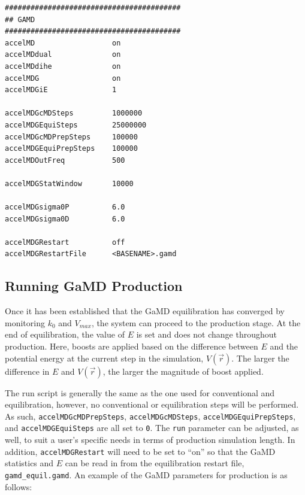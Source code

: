 \documentclass[9pt,tutorial]{livecoms}
\begin{document}
\begin{lstlisting}[label=gamd_prod,caption=gamd\_equil.in, basicstyle=\small,backgroundcolor=\color{light-gray}]
#########################################
## GAMD                    
#########################################
accelMD                  on             
accelMDdual              on
accelMDdihe              on
accelMDG                 on        
accelMDGiE               1             
         
accelMDGcMDSteps         1000000        
accelMDGEquiSteps        25000000     
accelMDGcMDPrepSteps     100000         
accelMDGEquiPrepSteps    100000         
accelMDOutFreq           500

accelMDGStatWindow       10000

accelMDGsigma0P          6.0            
accelMDGsigma0D          6.0 

accelMDGRestart          off 
accelMDGRestartFile      <BASENAME>.gamd  

\end{lstlisting}

\subsection{Running GaMD Production}
\label{ss:gamd_production}
Once it has been established that the GaMD equilibration has converged by monitoring $k_{0}$ and $V_{max}$, the system can proceed to the production stage. At the end of equilibration, the value of $E$ is set and does not change throughout production. Here, boosts are applied based on the difference between $E$ and the potential energy at the current step in the simulation, $V\left(\vec{r}\right)$. The larger the difference in $E$ and $V\left(\vec{r}\right)$, the larger the magnitude of boost applied. 

The run script is generally the same as the one used for conventional and equilibration, however, no conventional or equilibration steps will be performed. As such, \texttt{accelMDGcMDPrepSteps}, \texttt{accelMDGcMDSteps}, \texttt{accelMDGEquiPrepSteps}, and \texttt{accelMDGEquiSteps} are all set to \texttt{0}. The \texttt{run} parameter can be adjusted, as well, to suit a user's specific needs in terms of production simulation length. In addition, \texttt{accelMDGRestart} will need to be set to ``on'' so that the GaMD statistics and $E$ can be read in from the equilibration restart file, \texttt{gamd\_equil.gamd}. An example of the GaMD parameters for production is as follows:
\end{document}
